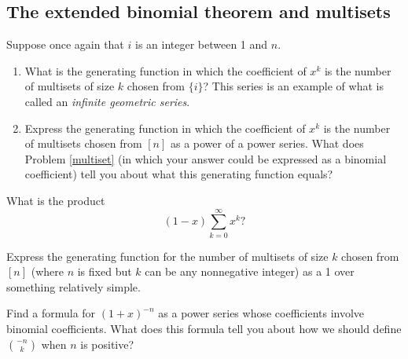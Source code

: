 \ep


\subsection{The extended binomial theorem and multisets}
\bp \iteme Suppose once again that $i$ is an integer between 1 and $n$.
\begin{enumerate}
\item What is the generating function in which the coefficient
of
$x^k$ is the number of multisets of size $k$ chosen from $\{i\}$?  This
series is an example of what is called an {\em infinite geometric
series}.
\item Express the generating function in which the coefficient of $x^k$
is the number of multisets chosen from $[n]$ as a power of a power
series.  What does Problem \ref{multiset} (in which your answer could
be expressed as a binomial coefficient) tell you about what this
generating function equals?  
\end{enumerate}

 \itemm  What is the product $$(1-x)\sum_{k=0}^\infty x^k?$$

\itemei Express the generating function for the number of multisets of
size
$k$ chosen from $[n]$ (where $n$ is fixed but $k$ can be any nonnegative
integer) as a 1 over something relatively simple.

\iteme Find a formula for $(1+x)^{-n}$ as a power series whose coefficients
involve binomial coefficients.   What does this formula tell you about
how we should define
$-n\choose k$ when $n$ is positive? \label{negnchoosek} 

